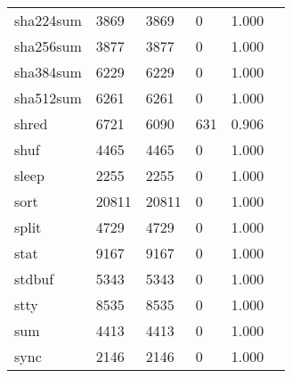 \begin{longtable}{lp{2.4cm}p{2.4cm}p{2.4cm}p{2.4cm}p{2.4cm}}
sha224sum &                                    3869 &                        3869 &                            0 &                                   1.000 \\
sha256sum &                                    3877 &                        3877 &                            0 &                                   1.000 \\
sha384sum &                                    6229 &                        6229 &                            0 &                                   1.000 \\
sha512sum &                                    6261 &                        6261 &                            0 &                                   1.000 \\
shred     &                                    6721 &                        6090 &                          631 &                                   0.906 \\
shuf      &                                    4465 &                        4465 &                            0 &                                   1.000 \\
sleep     &                                    2255 &                        2255 &                            0 &                                   1.000 \\
sort      &                                   20811 &                       20811 &                            0 &                                   1.000 \\
split     &                                    4729 &                        4729 &                            0 &                                   1.000 \\
stat      &                                    9167 &                        9167 &                            0 &                                   1.000 \\
stdbuf    &                                    5343 &                        5343 &                            0 &                                   1.000 \\
stty      &                                    8535 &                        8535 &                            0 &                                   1.000 \\
sum       &                                    4413 &                        4413 &                            0 &                                   1.000 \\
sync      &                                    2146 &                        2146 &                            0 &                                   1.000 \\

\end{longtable}
